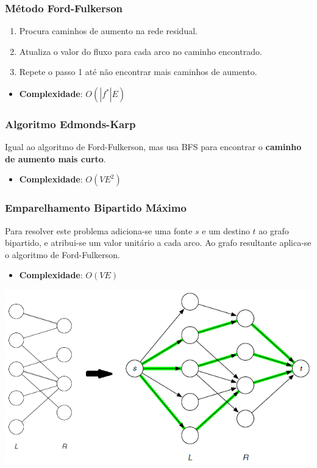 \documentclass[11pt]{article}
\begin{document}
\subsubsection{Método Ford-Fulkerson}

\begin{enumerate}
    \item Procura caminhos de aumento na rede residual.
    \item Atualiza o valor do fluxo para cada arco no caminho encontrado.
    \item Repete o passo 1 até não encontrar mais caminhos de aumento.
\end{enumerate}
\begin{itemize}[topsep=0pt]
    \item \textbf{Complexidade}: $O(|f^*|E)$
\end{itemize}

\subsubsection{Algoritmo Edmonds-Karp}

Igual ao algoritmo de Ford-Fulkerson, mas usa BFS para encontrar o \textbf{caminho de aumento mais curto}.

\begin{itemize}[topsep=0pt]
    \item \textbf{Complexidade}: $O(VE^2)$
\end{itemize}

\begin{minipage}{0.5\textwidth}
    \subsubsection{Emparelhamento Bipartido Máximo}
    Para resolver este problema adiciona-se uma fonte $s$ e um destino $t$ ao grafo bipartido, e atribui-se um valor unitário a cada arco. Ao grafo resultante aplica-se o algoritmo de Ford-Fulkerson.
    \begin{itemize}
        \item \textbf{Complexidade}: $O(VE)$
    \end{itemize}
\end{minipage}
\begin{minipage}{0.49\textwidth}
    \includegraphics[scale=0.45,right]{maximum_bipartite_matching.png}
\end{minipage}
\end{document}
